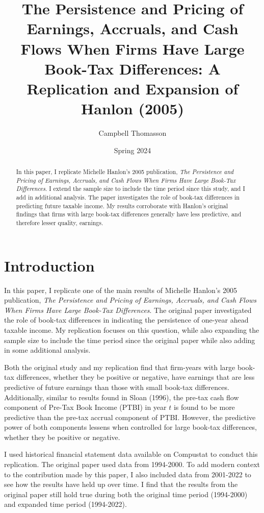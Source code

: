\documentclass{article}
\title{The Persistence and Pricing of Earnings, Accruals, and Cash Flows When Firms Have Large Book-Tax Differences: A Replication and Expansion of Hanlon (2005)}
\author{Campbell Thomasson}
\date{Spring 2024}
\begin{document}
\maketitle

\begin{abstract}
In this paper, I replicate Michelle Hanlon's 2005 publication, \textit{The Persistence and Pricing of Earnings, Accruals, and Cash Flows When Firms Have Large Book-Tax Differences}. I extend the sample size to include the time period since this study, and I add in additional analysis. The paper investigates the role of book-tax differences in predicting future taxable income. My results corroborate with Hanlon's original findings that firms with large book-tax differences generally have less predictive, and therefore lesser quality, earnings.
\end{abstract}

\section{Introduction}
In this paper, I replicate one of the main results of Michelle Hanlon’s 2005 publication, \textit{The Persistence and Pricing of Earnings, Accruals, and Cash Flows When Firms Have Large Book-Tax Differences}. The original paper investigated the role of book-tax differences in indicating the persistence of one-year ahead taxable income. My replication focuses on this question, while also expanding the sample size to include the time period since the original paper while also adding in some additional analysis.

Both the original study and my replication find that firm-years with large book-tax differences, whether they be positive or negative, have earnings that are less predictive of future earnings than those with small book-tax differences. Additionally, similar to results found in Sloan (1996), the pre-tax cash flow component of Pre-Tax Book Income (PTBI) in year $t$ is found to be more predictive than the pre-tax accrual component of PTBI. However, the predictive power of both components lessens when controlled for large book-tax differences, whether they be positive or negative.

I used historical financial statement data available on Compustat to conduct this replication. The original paper used data from 1994-2000. To add modern context to the contribution made by this paper, I also included data from 2001-2022 to see how the results have held up over time. I find that the results from the original paper still hold true during both the original time period (1994-2000) and expanded time period (1994-2022).
\end{document}
